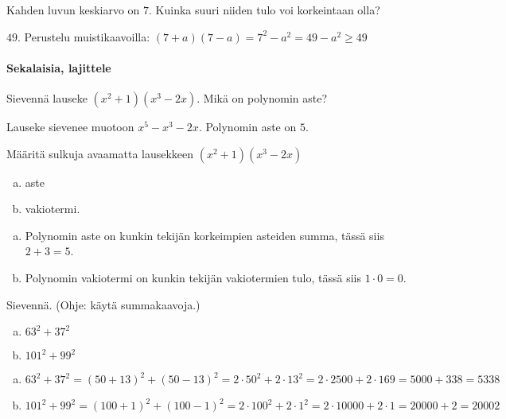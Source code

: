 \begin{tehtava} %
    Kahden luvun keskiarvo on $7$. Kuinka suuri niiden tulo voi korkeintaan olla?
    \begin{vastaus}
        $49$. Perustelu muistikaavoilla: $(7+a)(7-a)=7^2-a^2 = 49-a^2 \geq 49$
    \end{vastaus}
\end{tehtava}

\paragraph*{Sekalaisia, lajittele}

\begin{tehtava}
    Sievennä lauseke $(x^2+1)(x^3-2x)$. Mikä on polynomin aste?
    \begin{vastaus}
        Lauseke sievenee muotoon $x^5-x^3-2x$. Polynomin aste on $5$.
    \end{vastaus}
\end{tehtava}

\begin{tehtava}
    Määritä sulkuja avaamatta lausekkeen $(x^2+1)(x^3-2x)$
    \begin{enumerate}[a)]
        \item aste
        \item vakiotermi.
    \end{enumerate}
    \begin{vastaus}
        \begin{enumerate}[a)]
            \item Polynomin aste on kunkin tekijän korkeimpien asteiden summa, tässä siis $2+3=5$.
            \item Polynomin vakiotermi on kunkin tekijän vakiotermien tulo, tässä siis $1\cdot 0=0$.
        \end{enumerate}
    \end{vastaus}
\end{tehtava}


\begin{tehtava}
    Sievennä. (Ohje: käytä summakaavoja.)
    \begin{enumerate}[a)]
        \item $63^2+37^2$
        \item $101^2+99^2$
    \end{enumerate}
    \begin{vastaus}
        \begin{enumerate}[a)]
            \item $63^2+37^2 = (50+13)^2+(50-13)^2 = 2\cdot 50^2 + 2\cdot 13^2 = 2\cdot 2500 +2\cdot 169 = 5000 + 338 = 5338$
            \item $101^2+99^2 = (100+1)^2+(100-1)^2 = 2\cdot 100^2 + 2\cdot 1^2 = 2\cdot 10000 + 2\cdot 1 = 20000 + 2 = 20002$
        \end{enumerate}
    \end{vastaus}
\end{tehtava}

